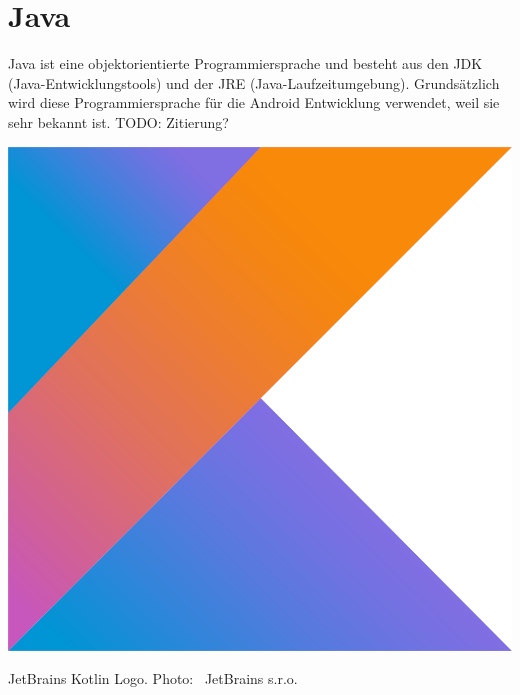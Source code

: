 \documentclass{sigchi-ext}
\begin{document}
\section{Java}
Java ist eine objektorientierte Programmiersprache und besteht aus den JDK (Java-Entwicklungstools) und der JRE
 (Java-Laufzeitumgebung). Grundsätzlich wird diese Programmiersprache für die Android Entwicklung 
 verwendet, weil sie sehr bekannt ist. TODO: Zitierung?


\begin{marginfigure}[-12pc]
  \begin{minipage}{\marginparwidth}
    \centering
    \includegraphics[width=0.9\marginparwidth]{figures/kotlinlogo.png}
    \caption{JetBrains Kotlin Logo. Photo:
      \cczero~JetBrains s.r.o.}
  \end{minipage}
\end{marginfigure}
\end{document}
